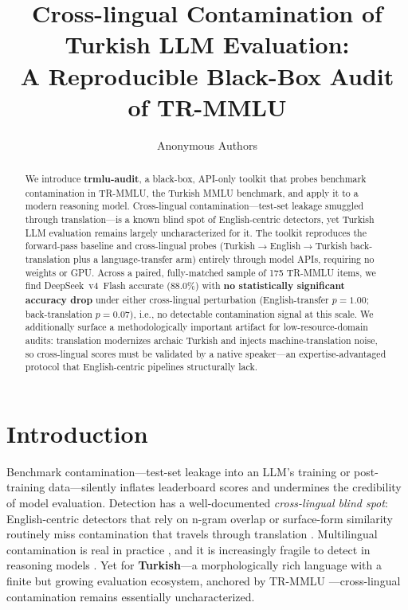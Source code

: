 \documentclass[11pt]{article}
\title{Cross-lingual Contamination of Turkish LLM Evaluation:\\ A Reproducible Black-Box Audit of TR-MMLU}
\author{Anonymous Authors}
\date{}
\begin{document}
\maketitle

\begin{abstract}
We introduce \textbf{trmlu-audit}, a black-box, API-only toolkit that probes benchmark contamination in TR-MMLU, the Turkish MMLU benchmark, and apply it to a modern reasoning model. Cross-lingual contamination---test-set leakage smuggled through translation---is a known blind spot of English-centric detectors, yet Turkish LLM evaluation remains largely uncharacterized for it. The toolkit reproduces the forward-pass baseline and cross-lingual probes (Turkish$\rightarrow$English$\rightarrow$Turkish back-translation plus a language-transfer arm) entirely through model APIs, requiring no weights or GPU. Across a paired, fully-matched sample of 175 TR-MMLU items, we find DeepSeek~v4~Flash accurate (88.0\%) with \textbf{no statistically significant accuracy drop} under either cross-lingual perturbation (English-transfer $p{=}1.00$; back-translation $p{=}0.07$), i.e., no detectable contamination signal at this scale. We additionally surface a methodologically important artifact for low-resource-domain audits: translation modernizes archaic Turkish and injects machine-translation noise, so cross-lingual scores must be validated by a native speaker---an expertise-advantaged protocol that English-centric pipelines structurally lack.
\end{abstract}

\section{Introduction}

Benchmark contamination---test-set leakage into an LLM's training or post-training data---silently inflates leaderboard scores and undermines the credibility of model evaluation. Detection has a well-documented \emph{cross-lingual blind spot}: English-centric detectors that rely on n-gram overlap or surface-form similarity routinely miss contamination that travels through translation \cite{yang2024data}. Multilingual contamination is real in practice \cite{contammulti2024}, and it is increasingly fragile to detect in reasoning models \cite{fragile2025reasoning}. Yet for \textbf{Turkish}---a morphologically rich language with a finite but growing evaluation ecosystem, anchored by TR-MMLU \cite{trmmu2024}---cross-lingual contamination remains essentially uncharacterized.
\end{document}
